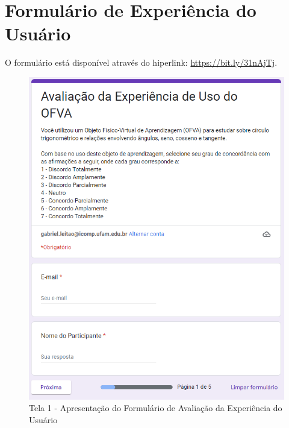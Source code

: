 \chapter{Formulário de Experiência do Usuário} \label{Chap:AppendixUX}

O formulário está disponível através do hiperlink: \url{https://bit.ly/31nAjTj}.

\begin{figure}[htb]
	\centering
	\includegraphics[width=0.7\linewidth]{chapters/appendixUX/UX_Tela1.png}
	\caption{Tela 1 - Apresentação do Formulário de Avaliação da Experiência do Usuário}
	\label{fig:UX_Tela1}
\end{figure}

